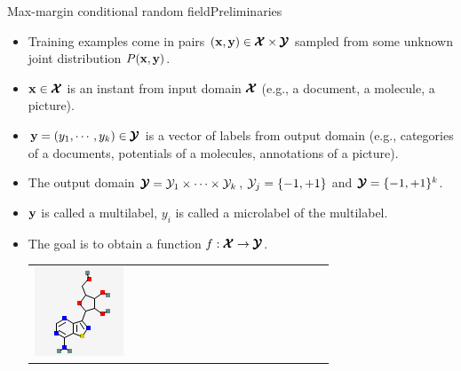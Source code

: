 \documentclass[first=dgreen,second=purple,logo=yellowexc]{aaltoslides}
\begin{document}
{\begin{frame}{Max-margin conditional random field}{Preliminaries}
	\begin{itemize}
		\item Training examples come in pairs $(\mathbf {x},\mathbf {y})\in\pmb {\mathcal{X}}\times\pmb {\mathcal{Y}}$ sampled from some unknown joint distribution $P(\mathbf {x},\mathbf {y})$.
		\item $\mathbf {x}\in\pmb {\mathcal{X}}$ is an instant from input domain $\pmb {\mathcal{X}}$ (e.g., a document, a molecule, a picture).
		\item $\mathbf {y}=(y_1,\cdots,y_k)\in\pmb {\mathcal{Y}}$ is a vector of labels from output domain (e.g., categories of a documents, potentials of a molecules, annotations of a picture).
		\item The output domain $\pmb {\mathcal{Y}}=\mathcal{Y}_1\times\cdots\times\mathcal{Y}_k$, $\mathcal{Y}_j=\{-1,+1\}$ and $\pmb {\mathcal{Y}}=\{-1,+1\}^k$.
		\item $\mathbf {y}$ is called a multilabel, $y_i$ is called a microlabel of the multilabel.
		\item The goal is to obtain a function $f:\pmb {\mathcal{X}}\rightarrow\pmb {\mathcal{Y}}$.
		\begin{table}
        \scriptsize
 \begin{tabular}{p{1cm}p{0.08cm}p{0.08cm}p{0.08cm}p{0.08cm}p{0.08cm}p{0.08cm}p{0.08cm}p{0.08cm}p{0.08cm}p{0.08cm}p{0.08cm}p{0.08cm}p{0.08cm}p{0.08cm}p{0.08cm}p{0.08cm}}
        \multirow{4}{*}{\includegraphics[scale = 0.3]{./figures/mol1.png}} & 
           &   &   &   &   &   &   &   &   &   &   &   &   &   &  \\ 
        &   &   &   &   &   & &   &   &   &   &  &   &   &   &  \\ 
        &   &   &   &  &   &   &   &  &   &   &   &   &  &   &  \\ 
        &   &   &   &   &   &   &   &   &  &   &   &   &   &   &  \\ 
        \end{tabular}
        \end{table}
	\end{itemize}
\end{frame}

}
\end{document}
